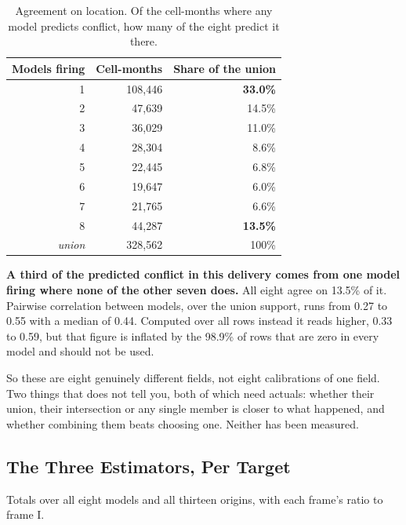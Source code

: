 \begin{table}[h!]
\centering
\small
\renewcommand{\arraystretch}{1.2}
\caption{Agreement on location. Of the cell-months where any model predicts conflict, how many of
the eight predict it there.}
\label{tab:agreement}
\begin{tabular}{@{}rrr@{}}
\toprule
\textbf{Models firing} & \textbf{Cell-months} & \textbf{Share of the union} \\ \midrule
1 & 108,446 & \textbf{33.0\%} \\
2 &  47,639 & 14.5\% \\
3 &  36,029 & 11.0\% \\
4 &  28,304 &  8.6\% \\
5 &  22,445 &  6.8\% \\
6 &  19,647 &  6.0\% \\
7 &  21,765 &  6.6\% \\
8 &  44,287 & \textbf{13.5\%} \\ \midrule
\textit{union} & 328,562 & 100\% \\
\bottomrule
\end{tabular}
\end{table}

\noindent \textbf{A third of the predicted conflict in this delivery comes from one model firing
where none of the other seven does.} All eight agree on 13.5\% of it. Pairwise correlation between
models, over the union support, runs from 0.27 to 0.55 with a median of 0.44. Computed over all
rows instead it reads higher, 0.33 to 0.59, but that figure is inflated by the 98.9\% of rows that
are zero in every model and should not be used.

So these are eight genuinely different fields, not eight calibrations of one field. Two things that
does not tell you, both of which need actuals: whether their union, their intersection or any
single member is closer to what happened, and whether combining them beats choosing one. Neither
has been measured.

\subsection*{The Three Estimators, Per Target}

Totals over all eight models and all thirteen origins, with each frame's ratio to frame I.

